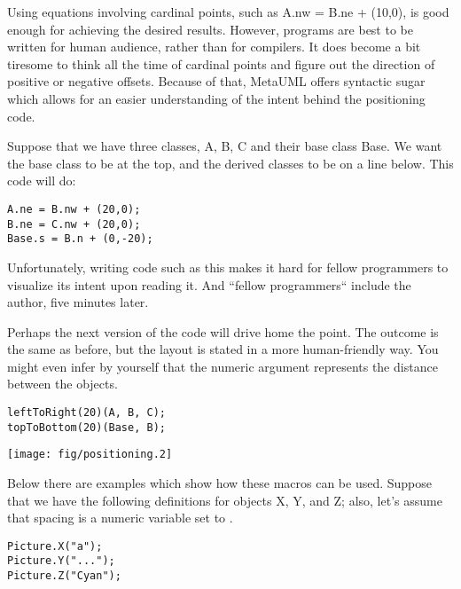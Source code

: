 \documentclass{article}
\newcommand{\code}{\ttfamily}
\begin{document}
Using equations involving cardinal points, such as {\code A.nw = B.ne + (10,0)}, is
good enough for achieving the desired results. However, programs are best to
be written for human audience, rather than for compilers. It does become a bit
tiresome to think all the time of cardinal points and figure out the
direction of positive or negative offsets. Because of that, MetaUML offers
syntactic sugar which allows for an easier understanding of the intent behind
the positioning code.

Suppose that we have three classes, {\code A}, {\code B}, {\code C} and their base class
{\code Base}. We want the base class to be at the top, and the derived classes to be
on a line below. This code will do:

\begin{verbatim}
A.ne = B.nw + (20,0);
B.ne = C.nw + (20,0);
Base.s = B.n + (0,-20);
\end{verbatim}

Unfortunately, writing code such as this makes it hard for fellow programmers to visualize
its intent upon reading it. And ``fellow programmers`` include the author, five minutes later.

Perhaps the next version of the code will drive home the point. The outcome is
the same as before, but the layout is stated in a more human-friendly way. You might even
infer by yourself that the numeric argument represents the distance between the objects.

\begin{multicols}{2}
\begin{verbatim}
leftToRight(20)(A, B, C);
topToBottom(20)(Base, B);
\end{verbatim}
\columnbreak
\hspace{1cm}\texttt{[image: fig/positioning.2]}
\end{multicols}

Below there are examples which show how these macros can be used. Suppose that we have the 
following definitions for objects {\code X}, {\code Y}, and {\code Z}; also, let's assume 
that {\code spacing} is a numeric variable set to {\code 5}.

\begin{verbatim}
Picture.X("a");
Picture.Y("...");
Picture.Z("Cyan");
\end{verbatim}
\end{document}
